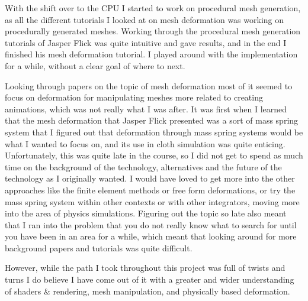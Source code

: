 With the shift over to the CPU I started to work on procedural mesh generation, as all the different tutorials I looked at
on mesh deformation was working on procedurally generated meshes. Working through the procedural mesh generation tutorials
of Jasper Flick was quite intuitive and gave results, and in the end I finished his mesh deformation tutorial.
I played around with the implementation for a while, without a clear goal of where to next.

Looking through papers on the topic of mesh deformation most of it seemed to focus on deformation for manipulating meshes more related to creating animations,
which was not really what I was after. 
It was first when I learned that the mesh deformation that Jasper Flick\cite{catlike_mesh_deformation} presented was a sort of mass spring system
that I figured out that deformation through mass spring systems would be what I wanted to focus on, and its use in cloth simulation was quite enticing.
Unfortunately, this was quite late in the course, so I did not get to spend as much time on the background of the technology, alternatives
and the future of the technology as I originally wanted.
I would have loved to get more into the other approaches like the finite element methods or free form deformations, or try the mass spring system
within other contexts or with other integrators, moving more into the area of physics simulations.
Figuring out the topic so late also meant that I ran into the problem that you do not really know what to search for until you have been in an area for a while,
which meant that looking around for more background papers and tutorials was quite difficult.

However, while the path I took throughout this project was full of twists and turns I do believe I have come out of it with a greater and wider understanding of
shaders \& rendering, mesh manipulation, and physically based deformation.



